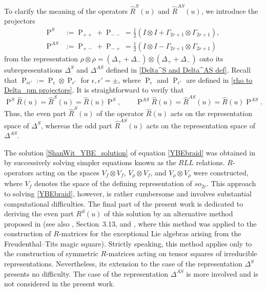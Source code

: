 \documentclass[a4paper]{article}
\newcommand{\hR}{\hat{R}}
\renewcommand{\=}{\ =\ }
\DeclareMathOperator{\proj}{P}
\numberwithin{equation}{section}
\theoremstyle{remark}
\begin{document}
To clarify the meaning of the operators $\hR^{S}(u)$ and $\hR^{AS}(u)$, we introduce the projectors
\begin{align}
\proj^{S}&:=\proj_{++}+\proj_{--}
=\frac{1}{2}(I\otimes I+\Gamma_{2r+1}\otimes \Gamma_{2r+1}),\label{proj^+}\\
\proj^{AS}&:=\proj_{+-}+\proj_{-+}
=\frac{1}{2}(I\otimes I-\Gamma_{2r+1}\otimes \Gamma_{2r+1})\label{proj^-}
\end{align}
from the representation $\rho\otimes \rho=(\Delta_++\Delta_-)\otimes (\Delta_++\Delta_-)$ onto its subrepresentations $\Delta^S$ and $\Delta^{AS}$ defined in \eqref{Delta^S and Delta^AS def}. Recall that $\proj_{\epsilon\epsilon'}:=\proj_\epsilon\otimes \proj_{\epsilon'}$ for $\epsilon,\epsilon'=\pm$, where $\proj_\epsilon$ and $\proj_{\epsilon'}$ are defined in \eqref{rho to Delta_pm projectors}. It is straightforward to verify that
\begin{equation}\label{hR^S and hR^AS projection properties}
\proj^{S}\hR(u)=\hR^{S}(u)=\hR(u)\proj^{S},\qquad
\proj^{AS}\hR(u)=\hR^{AS}(u)=\hR(u)\proj^{AS}.
\end{equation}
Thus, the even part $\hR^{S}(u)$ of the operator $\hR(u)$ acts on the representation space of $\Delta^S$, whereas the odd part $\hR^{AS}(u)$ acts on the representation space of $\Delta^{AS}$.

The solution \eqref{ShanWit_YBE_solution} of equation \eqref{YBEbraid} was obtained in \cite{ShanWit} by successively solving simpler equations known as the $RLL$ relations. $R$-operators acting on the spaces $V_f\otimes V_f$, $V_\rho\otimes V_f$, and $V_\rho\otimes V_\rho$ were constructed, where $V_f$ denotes the space of the defining representation of $so_{2r}$. This approach to solving \eqref{YBEbraid}, however, is rather cumbersome and involves substantial computational difficulties. The final part of the present work is dedicated to deriving the even part $R^{S}(u)$ of this solution by an alternative method proposed in \cite{MacKay} (see also \cite{IsQGLect}, Section~3.13, and \cite{West}, where this method was applied to the construction of $R$-matrices for the exceptional Lie algebras arising from the Freudenthal--Tits magic square). Strictly speaking, this method applies only to the construction of symmetric $R$-matrices acting on tensor squares of irreducible representations. Nevertheless, its extension to the case of the representation $\Delta^{S}$ presents no difficulty. The case of the representation $\Delta^{AS}$ is more involved and is not considered in the present work.
\end{document}
